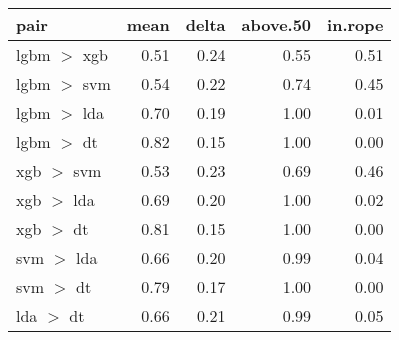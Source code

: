 \begin{tabular}{lrrrr}
  \toprule
{\bfseries pair} & {\bfseries mean} & {\bfseries delta} & {\bfseries above.50} & {\bfseries in.rope} \\ 
  \midrule
lgbm $>$ xgb & 0.51 & 0.24 & 0.55 & 0.51 \\ 
  lgbm $>$ svm & 0.54 & 0.22 & 0.74 & 0.45 \\ 
  lgbm $>$ lda & 0.70 & 0.19 & 1.00 & 0.01 \\ 
  lgbm $>$ dt & 0.82 & 0.15 & 1.00 & 0.00 \\ 
  xgb $>$ svm & 0.53 & 0.23 & 0.69 & 0.46 \\ 
  xgb $>$ lda & 0.69 & 0.20 & 1.00 & 0.02 \\ 
  xgb $>$ dt & 0.81 & 0.15 & 1.00 & 0.00 \\ 
  svm $>$ lda & 0.66 & 0.20 & 0.99 & 0.04 \\ 
  svm $>$ dt & 0.79 & 0.17 & 1.00 & 0.00 \\ 
  lda $>$ dt & 0.66 & 0.21 & 0.99 & 0.05 \\ 
   \bottomrule
\end{tabular}
